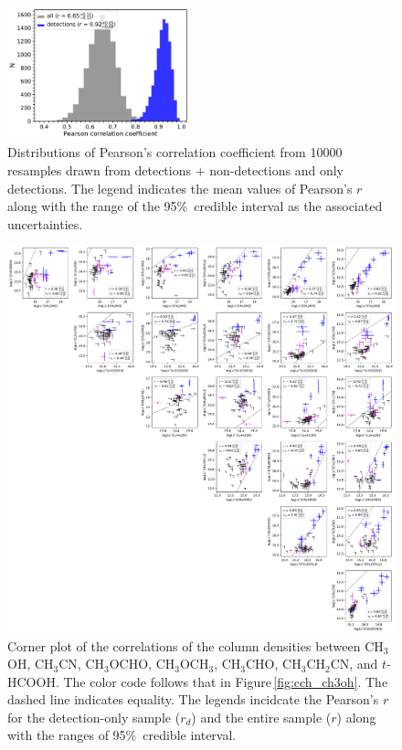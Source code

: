 \documentclass[twocolumn]{aastex62}
\newcommand{\methylformate}{\mbox{CH$_{3}$OCHO}}
\newcommand{\methanol}{\mbox{CH$_{3}$OH}}
\newcommand{\dimethylether}{\mbox{CH$_{3}$OCH$_{3}$}}
\newcommand{\acetaldehyde}{\mbox{CH$_{3}$CHO}}
\newcommand{\ethylcyanide}{\mbox{CH$_{3}$CH$_{2}$CN}}
\newcommand{\methylcyanide}{\mbox{CH$_{3}$CN}}
\begin{document}
\begin{figure}[htbp!]
  \centering
  \includegraphics[width=0.47\textwidth]{pearson_r_ch3oh_ch3cn.pdf}
  \caption{Distributions of Pearson's correlation coefficient from 10000 resamples drawn from detections $+$ non-detections and only detections.  The legend indicates the mean values of Pearson's $r$ along with the range of the 95\%\ credible interval as the associated uncertainties.}
  \label{fig:pearson_distribution}
\end{figure}

\begin{figure}[htbp!]
  \centering
  \includegraphics[width=\textwidth]{corner_Ncol_correlations.pdf}
  \caption{Corner plot of the correlations of the column densities between \methanol, \methylcyanide, \methylformate, \dimethylether, \acetaldehyde, \ethylcyanide, and $t$-HCOOH.  The color code follows that in Figure\,\ref{fig:cch_ch3oh}.  The dashed line indicates equality.  The legends incidcate the Pearson's $r$ for the detection-only sample ($r_{d}$) and the entire sample ($r$) along with the ranges of 95\%\ credible interval.}
  \label{fig:corner}
\end{figure}
\end{document}
